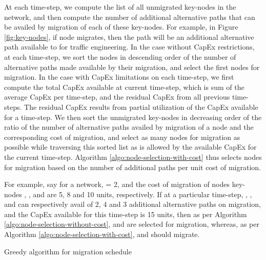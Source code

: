 \documentclass[conference]{IEEEtran}
\begin{document}
\par At each time-step, we compute the list of all unmigrated key-nodes in the
network, and then compute the number of additional alternative paths that can be
availed by migration of each of these key-nodes. For example, in Figure
\ref{fig:key-nodes}, if node  migrates, then the path  will be an
additional alternative path available to  for traffic engineering. In the
case without CapEx restrictions, at each time-step, we sort the nodes in
descending order of the number of alternative paths made available by their
migration, and select the first  nodes for migration.
In the case with CapEx limitations on each time-step, we first compute the total
CapEx available at current time-step, which is sum of the average CapEx per
time-step, and the residual CapEx from all previous time-steps. The residual
CapEx results from partial utilization of the CapEx available for a time-step.
We then sort the unmigrated key-nodes in decreasing order of the ratio of the
number of alternative paths availed by migration of a node and the corresponding
cost of migration, and select as many nodes for migration as possible while
traversing this sorted list as is allowed by the available CapEx for the current
time-step.
Algorithm \ref{algo:node-selection-with-cost} thus selects nodes for migration
based on the number of additional paths per unit cost of migration.

\par For example, say for a network,  = 2, and the cost of migration of nodes
key-nodes , , and  are 5, 8 and 10 units, respectively. If
at a particular time-step, , , and  can respectively avail of 2, 4 and
3 additional alternative paths on migration, and the CapEx available for this
time-step is 15 units, then as per Algorithm
\ref{algo:node-selection-without-cost},  and  are selected for migration,
whereas, as per Algorithm \ref{algo:node-selection-with-cost},  and 
should migrate.

\begin{algorithm}
\caption{Greedy algorithm for migration schedule} \label{algo:greedy-algo}
\begin{algorithmic}
	\FORALL {}
	\ENDFOR
\ENDFOR
\end{algorithmic}
\end{algorithm}
\end{document}
